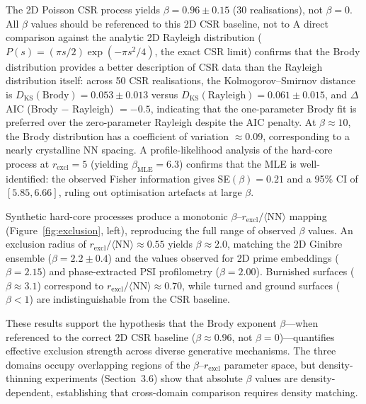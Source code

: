 \documentclass[final,3p,times,twocolumn]{elsarticle}
\theoremstyle{definition}
\begin{document}
The 2D Poisson CSR process yields $\beta = 0.96 \pm 0.15$
(30 realisations), not $\beta = 0$. All $\beta$
values should be referenced to this 2D CSR baseline, not to
A direct comparison against the analytic 2D Rayleigh distribution
($P(s) = (\pi s/2)\exp(-\pi s^2/4)$, the exact CSR limit) confirms
that the Brody distribution provides a better description of CSR
data than the Rayleigh distribution itself: across 50 CSR
realisations, the Kolmogorov--Smirnov distance is
$D_{\text{KS}}(\text{Brody}) = 0.053 \pm 0.013$ versus
$D_{\text{KS}}(\text{Rayleigh}) = 0.061 \pm 0.015$, and $\Delta$AIC
(Brody $-$ Rayleigh) $= -0.5$, indicating that the one-parameter Brody
fit is preferred over the zero-parameter Rayleigh despite the AIC
penalty. At $\beta \approx 10$, the Brody distribution has a
coefficient of variation $\approx 0.09$, corresponding to a nearly
crystalline NN spacing. A profile-likelihood analysis of the
hard-core process at $r_{\text{excl}} = 5$ (yielding $\beta_{\text{MLE}}
= 6.3$) confirms that the MLE is well-identified: the observed Fisher
information gives SE$(\beta) = 0.21$ and a 95\% CI of $[5.85, 6.66]$,
ruling out optimisation artefacts at large $\beta$.

Synthetic hard-core processes produce a monotonic
$\beta$--$r_{\text{excl}}/\langle\text{NN}\rangle$ mapping
(Figure~\ref{fig:exclusion}, left), reproducing the full range of
observed $\beta$ values. An exclusion radius of
$r_{\text{excl}}/\langle\text{NN}\rangle \approx 0.55$ yields
$\beta \approx 2.0$, matching the 2D Ginibre ensemble
($\beta = 2.2 \pm 0.4$) and the values observed for 2D prime
embeddings ($\beta = 2.15$) and phase-extracted PSI
profilometry ($\beta = 2.00$). Burnished surfaces
($\beta \approx 3.1$) correspond to
$r_{\text{excl}}/\langle\text{NN}\rangle \approx 0.70$, while
turned and ground surfaces ($\beta < 1$) are
indistinguishable from the CSR baseline.

These results support the hypothesis that the Brody exponent
$\beta$---when referenced to the correct 2D CSR baseline
($\beta \approx 0.96$, not $\beta = 0$)---quantifies effective
exclusion strength across diverse generative mechanisms.
The three domains occupy overlapping regions of the
$\beta$--$r_{\text{excl}}$ parameter space, but
density-thinning experiments (Section~3.6) show that absolute
$\beta$ values are density-dependent, establishing that
cross-domain comparison requires density matching.
\end{document}
